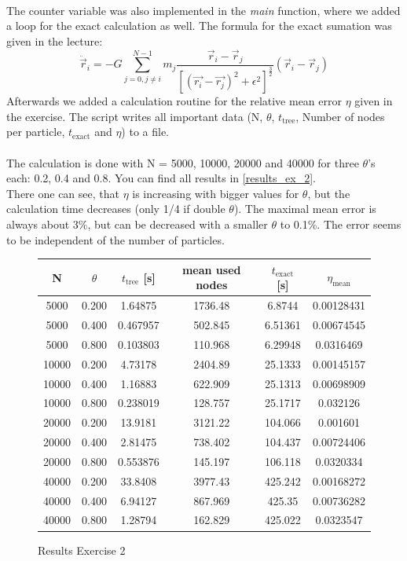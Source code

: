 \documentclass{scrartcl}
\begin{document}
	\\
	The counter variable was also implemented in the \emph{main} function, where we added a loop for the exact calculation as well. The formula for the exact sumation was given in the lecture:
	\begin{equation}
		\ddot{\vec{r}}_i = −G \sum_{j = 0, j \neq i}^{N - 1} m_j \frac{\vec{r}_i −\vec{r}_j}{[(\vec{r_i} - \vec{r_j})^2 + \epsilon^2]^\frac{3}{2}} (\vec{r}_i - \vec{r}_j)
	\end{equation}
	Afterwards we added a calculation routine for the relative mean error $\eta$ given in the exercise. The script writes all important data (N, $\theta$, $t_\text{tree}$, Number of nodes per particle, $t_\text{exact}$ and $\eta$) to a file.\\
	\\
	The calculation is done with N = 5000, 10000, 20000 and 40000 for three $\theta$'s each: 0.2, 0.4 and 0.8. You can find all results in \autoref{results_ex_2}.\\
	There one can see, that $\eta$ is increasing with bigger values for $\theta$, but the calculation time decreases (only 1/4 if double $\theta$). The maximal mean error is always about 3\%, but can be decreased with a smaller $\theta$ to 0.1\%. The error seems to be independent of the number of particles.	
	\begin{figure}
		\centering
		\begin{tabular}{cccccc}
			\toprule
			N & $\theta$ & $t_\text{tree}$ [s] &  mean used nodes &  $t_\text{exact}$ [s] & $\eta_\text{mean}$ \\
			\midrule
			5000 &  0.200 & 1.64875 &  1736.48  &  6.8744 &  0.00128431 \\
			5000 & 0.400 & 0.467957 &  502.845 &  6.51361 &  0.00674545\\
			5000 & 0.800 & 0.103803  & 110.968  & 6.29948 & 0.0316469\\
			10000 & 0.200  & 4.73178  & 2404.89  & 25.1333 & 0.00145157\\
			10000 & 0.400  & 1.16883  & 622.909  & 25.1313 & 0.00698909\\
			10000 & 0.800 & 0.238019 &  128.757  & 25.1717 & 0.032126\\
			20000 & 0.200 &  13.9181  & 3121.22  & 104.066 & 0.001601\\
			20000 & 0.400 &  2.81475  & 738.402  & 104.437 & 0.00724406\\
			20000 & 0.800 & 0.553876 &  145.197  & 106.118 & 0.0320334\\
			40000 & 0.200 &  33.8408 &  3977.43 &  425.242 & 0.00168272\\
			40000 & 0.400 &  6.94127  & 867.969 &   425.35 & 0.00736282\\
			40000 & 0.800 &  1.28794 &  162.829 &  425.022 & 0.0323547\\
			\bottomrule
		\end{tabular}
		\caption{Results Exercise 2}
		\label{results_ex_2}
	\end{figure}
	
\end{document}
